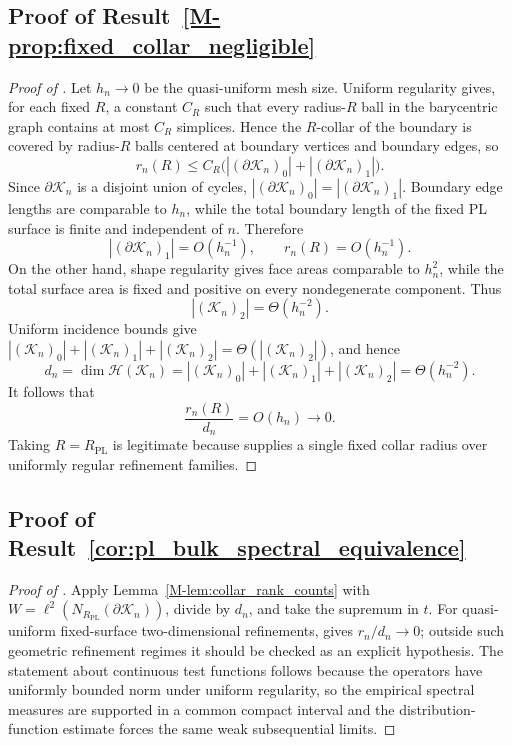 \documentclass[11pt]{article}
\numberwithin{equation}{section}
\theoremstyle{definition}
\theoremstyle{remark}
\newcommand{\K}{\mathcal{K}}
\newcommand{\Hil}{\mathcal{H}}
\newcommand{\bd}{\partial}
\begin{document}
\subsection{Proof of Result~\ref{M-prop:fixed_collar_negligible}}\label{app:proof:prop:fixed_collar_negligible}
\begin{proof}[Proof of ]
Let \(h_n\to0\) be the quasi-uniform mesh size. Uniform regularity gives, for each fixed
\(R\), a constant \(C_R\) such that every radius-\(R\) ball in the barycentric graph contains at
most \(C_R\) simplices. Hence the \(R\)-collar of the boundary is covered by radius-\(R\) balls
centered at boundary vertices and boundary edges, so
\[
r_n(R)
\le C_R\bigl(|(\bd\K_n)_0|+|(\bd\K_n)_1|\bigr).
\]
Since \(\bd\K_n\) is a disjoint union of cycles, \(|(\bd\K_n)_0|=|(\bd\K_n)_1|\). Boundary edge
lengths are comparable to \(h_n\), while the total boundary length of the fixed PL surface is
finite and independent of \(n\). Therefore
\[
|(\bd\K_n)_1|=O(h_n^{-1}),
\qquad
r_n(R)=O(h_n^{-1}).
\]
On the other hand, shape regularity gives face areas comparable to \(h_n^2\), while the total
surface area is fixed and positive on every nondegenerate component. Thus
\[
|(\K_n)_2|=\Theta(h_n^{-2}).
\]
Uniform incidence bounds give \(|(\K_n)_0|+|(\K_n)_1|+|(\K_n)_2|=\Theta(|(\K_n)_2|)\), and hence
\[
d_n=\dim\Hil(\K_n)=|(\K_n)_0|+|(\K_n)_1|+|(\K_n)_2|
=\Theta(h_n^{-2}).
\]
It follows that
\[
\frac{r_n(R)}{d_n}=O(h_n)\longrightarrow0 .
\]
Taking \(R=R_{\mathrm{PL}}\) is legitimate because
 supplies a single fixed collar radius over uniformly
regular refinement families.
\end{proof}

\subsection{Proof of Result~\ref{cor:pl_bulk_spectral_equivalence}}\label{app:proof:cor:pl_bulk_spectral_equivalence}
\begin{proof}[Proof of ]
Apply Lemma~\ref{M-lem:collar_rank_counts} with
\(W=\ell^2(N_{R_{\mathrm{PL}}}(\bd\K_n))\), divide by \(d_n\), and take the supremum in \(t\).
For quasi-uniform fixed-surface two-dimensional refinements,
 gives \(r_n/d_n\to0\); outside such geometric refinement
regimes it should be checked as an explicit hypothesis. The statement about continuous test
functions follows because the operators have uniformly bounded norm under uniform regularity, so
the empirical spectral measures are supported in a common compact interval and the
distribution-function estimate forces the same weak subsequential limits.
\end{proof}
\end{document}
